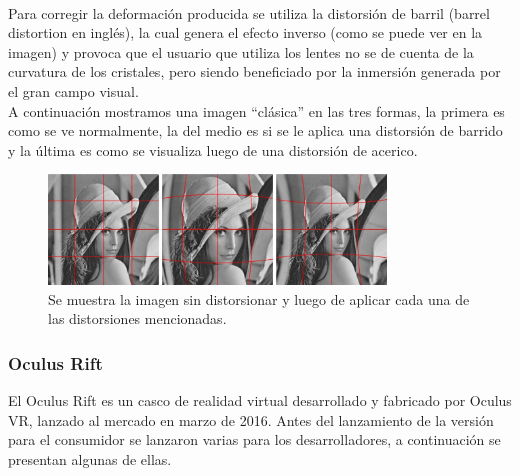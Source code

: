 \documentclass[12pt]{article}
\begin{document}
\\Para corregir la deformación producida se utiliza la distorsión de barril (barrel distortion en inglés), la cual genera el efecto inverso (como se puede ver en la imagen) y provoca que el usuario que utiliza los lentes no se de cuenta de la curvatura de los cristales, pero siendo beneficiado por la inmersión generada por el gran campo visual\cite{oculusrendering}. 
\\A continuación mostramos una imagen “clásica” en las tres formas, la primera es como se ve normalmente, la del medio es si se le aplica una distorsión de barrido y la última es como se visualiza luego de una distorsión de acerico.
\begin{figure}[h!]
\includegraphics[width=0.8\textwidth, center]{imagen_clasica.png}
\caption{Se muestra la imagen sin distorsionar y luego de aplicar cada una de las distorsiones mencionadas.}
\end{figure}

\subsubsection{ Oculus Rift}
El Oculus Rift es un casco de realidad virtual desarrollado y fabricado por Oculus VR, lanzado al mercado en marzo de 2016. Antes del lanzamiento de la versión para el consumidor se lanzaron varias para los desarrolladores, a continuación se presentan algunas de ellas\cite{oculus}.
\end{document}
